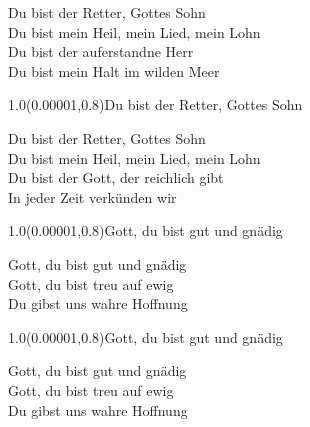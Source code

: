 \documentclass[aspectratio=169]{beamer}
\begin{document}
\begin{frame}
\centering
\color{white}
\huge{Du bist der Retter, Gottes Sohn} \\
\huge{Du bist mein Heil, mein Lied, mein Lohn} \\
\huge{Du bist der auferstandne Herr} \\
\huge{Du bist mein Halt im wilden Meer} \\

\begin{textblock}{1.0}(0.00001,0.8)\color{gray}\normalsize{Du bist der Retter, Gottes Sohn}\end{textblock}
\end{frame}

\begin{frame}
\centering
\color{white}
\huge{Du bist der Retter, Gottes Sohn} \\
\huge{Du bist mein Heil, mein Lied, mein Lohn} \\
\huge{Du bist der Gott, der reichlich gibt} \\
\huge{In jeder Zeit verkünden wir} \\

\begin{textblock}{1.0}(0.00001,0.8)\color{gray}\normalsize{Gott, du bist gut und gnädig}\end{textblock}
\end{frame}

\begin{frame}
\centering
\color{white}
\huge{Gott, du bist gut und gnädig} \\
\huge{Gott, du bist treu auf ewig} \\
\huge{Du gibst uns wahre Hoffnung} \\

\begin{textblock}{1.0}(0.00001,0.8)\color{gray}\normalsize{Gott, du bist gut und gnädig}\end{textblock}
\end{frame}

\begin{frame}
\centering
\color{white}
\huge{Gott, du bist gut und gnädig} \\
\huge{Gott, du bist treu auf ewig} \\
\huge{Du gibst uns wahre Hoffnung} \\
\end{frame}
\end{document}
